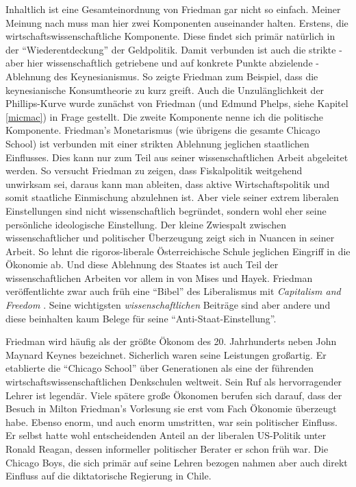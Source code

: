 Inhaltlich ist eine Gesamteinordnung von Friedman gar nicht so einfach. Meiner Meinung nach muss man hier zwei Komponenten auseinander halten. Erstens, die wirtschaftswissenschaftliche Komponente. Diese findet sich primär natürlich in der "`Wiederentdeckung"' der Geldpolitik. Damit verbunden ist auch die strikte - aber hier wissenschaftlich getriebene und auf konkrete Punkte abzielende - Ablehnung des Keynesianismus. So zeigte Friedman zum Beispiel, dass die keynesianische Konsumtheorie zu kurz greift. Auch die Unzulänglichkeit der Phillips-Kurve wurde zunächst von Friedman (und Edmund Phelps, siehe Kapitel \ref{micmac}) in Frage gestellt.
Die zweite Komponente nenne ich die politische Komponente. Friedman's Monetarismus (wie übrigens die gesamte Chicago School) ist verbunden mit einer strikten Ablehnung jeglichen staatlichen Einflusses. Dies kann nur zum Teil aus seiner wissenschaftlichen Arbeit abgeleitet werden. So versucht Friedman zu zeigen, dass Fiskalpolitik weitgehend unwirksam sei, daraus kann man ableiten, dass aktive Wirtschaftspolitik und somit staatliche Einmischung abzulehnen ist. Aber viele seiner extrem liberalen Einstellungen sind nicht wissenschaftlich begründet, sondern wohl eher seine persönliche ideologische Einstellung.
Der kleine Zwiespalt zwischen wissenschaftlicher und politischer Überzeugung zeigt sich in Nuancen in seiner Arbeit. So lehnt die rigoros-liberale Österreichische Schule jeglichen Eingriff in die Ökonomie ab. Und diese Ablehnung des Staates ist auch Teil der wissenschaftlichen Arbeiten vor allem in von Mises und Hayek. Friedman veröffentlichte zwar auch früh eine "`Bibel"' des Liberalismus mit \textit{Capitalism and Freedom} \textcite{Friedman1962}. Seine wichtigsten \textit{wissenschaftlichen} Beiträge sind aber andere und diese beinhalten kaum Belege für seine "`Anti-Staat-Einstellung"'. 

Friedman wird häufig als der größte Ökonom des 20. Jahrhunderts neben John Maynard Keynes bezeichnet. Sicherlich waren seine Leistungen großartig. Er etablierte die "`Chicago School"' über Generationen als eine  der führenden wirtschaftswissenschaftlichen Denkschulen weltweit. Sein Ruf als hervorragender Lehrer ist legendär. Viele spätere große Ökonomen berufen sich darauf, dass der Besuch in Milton Friedman's Vorlesung sie erst vom Fach Ökonomie überzeugt habe. Ebenso enorm, und auch enorm umstritten, war sein politischer Einfluss. Er selbst hatte wohl entscheidenden Anteil an der liberalen US-Politik unter Ronald Reagan, dessen informeller politischer Berater er schon früh war. Die Chicago Boys, die sich primär auf seine Lehren bezogen nahmen aber auch direkt Einfluss auf die diktatorische Regierung in Chile.

